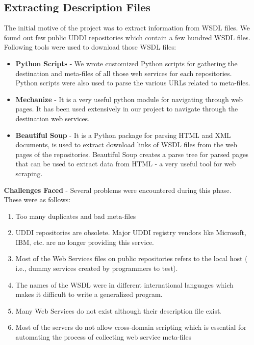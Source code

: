 \documentclass[12pt, twoside]{book}
\begin{document}
\subsection{Extracting Description Files}
The initial motive of the project was to extract information from WSDL files. We found out few public UDDI repositories which contain a few hundred WSDL files. Following tools were used to download those WSDL files:
\begin{itemize}
 \item \textbf{Python Scripts} - We wrote customized Python scripts for gathering the destination and meta-files of all those web services for each repositories. Python scripts were also used to parse the various URLs related to meta-files.
 \item \textbf{Mechanize} - It is a very useful python module for navigating through web pages. It has been used extensively in our project to navigate through the destination web services.
 \item \textbf{Beautiful Soup} - It is a Python package for parsing HTML and XML documents, is used to extract download links of WSDL files from the web pages of the repositories. Beautiful Soup creates a parse tree for parsed pages that can be used to extract data from HTML - a very useful tool for web scraping.
\end{itemize}
\textbf{Challenges Faced} - Several problems were encountered during this phase. These were as follows:
\begin{enumerate}
 \item Too many duplicates and bad meta-files
 \item UDDI repositories are obsolete. Major UDDI registry vendors like Microsoft, IBM, etc. are no longer providing this service.
 \item Most of the Web Services files on public repositories refers to the local host ( i.e., dummy services created by programmers to test).
 \item The names of the WSDL were in different international languages which makes it difficult to write a generalized program.
 \item Many Web Services do not exist although their description file exist.
 \item Most of the servers do not allow cross-domain scripting which is essential for automating the process of collecting web service meta-files
\end{enumerate}
\end{document}

